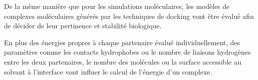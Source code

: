 

 \label{docking_eval}

De la même manière que pour les simulations moléculaires, les modèles de complexes moléculaires générés par les techniques de docking vont être évalué afin de décider de leur pertinence et stabilité biologique.

En plus des énergies propres à chaque partenaire évalué individuellement, des paramètres comme les contacts hydrophobes ou le nombre de liaisons hydrogènes entre les deux partenaires, le nombre des molécules ou la surface accessible au solvant à l'interface vont influer le calcul de l'énergie d'un complexe. 

